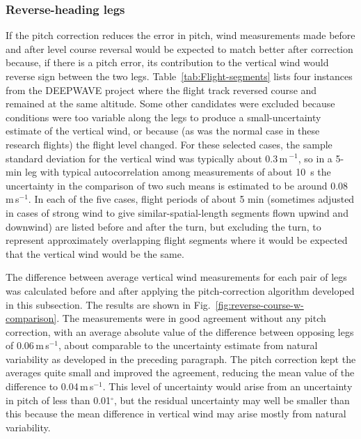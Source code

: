 \documentclass[english,british,amtd,bookmarks=false,unicode=true]{copernicus}\usepackage[]{graphicx}\usepackage[]{color}
\begin{document}
\subsubsection{Reverse-heading legs}

If the pitch correction reduces the error in pitch, wind measurements
made before and after level course reversal would be expected to match
better after correction because, if there is a pitch error, its contribution
to the vertical wind would reverse sign between the two legs. Table~\ref{tab:Flight-segments}
lists four instances from the DEEPWAVE project where the flight track
reversed course and remained at the same altitude. Some other candidates
were excluded because conditions were too variable along the legs
to produce a small-uncertainty estimate of the vertical wind, or because
(as was the normal case in these research flights) the flight level
changed. For these selected cases, the sample standard deviation for
the vertical wind was typically about 0.3\,m\,$^{-1}$, so in a
5-min leg with typical autocorrelation among measurements of about
10~s the uncertainty in the comparison of two such means is estimated
to be around 0.08\,m\,s$^{-1}$. In each of the five cases, flight
periods of about 5 min (sometimes adjusted in cases of strong wind
to give similar-spatial-length segments flown upwind and downwind)
are listed before and after the turn, but excluding the turn, to represent
approximately overlapping flight segments where it would be expected
that the vertical wind would be the same. 





The difference between average vertical wind measurements for each
pair of legs was calculated before and after applying the pitch-correction
algorithm developed in this subsection. The results are shown in Fig.~\ref{fig:reverse-course-w-comparison}.
The measurements were in good agreement without any pitch correction,
with an average absolute value of the difference between opposing
legs of 0.06\,m\,s$^{-1}$,
about comparable to the uncertainty estimate from natural variability
as developed in the preceding paragraph. The pitch correction kept
the averages quite small and improved the agreement, reducing the
mean value of the difference to 0.04\,m\,s$^{-1}$.
This level of uncertainty would arise from an uncertainty in pitch
of less than 0.01$^{\circ}$, but the residual uncertainty may well
be smaller than this because the mean difference in vertical wind
may arise mostly from natural variability. 
\end{document}
